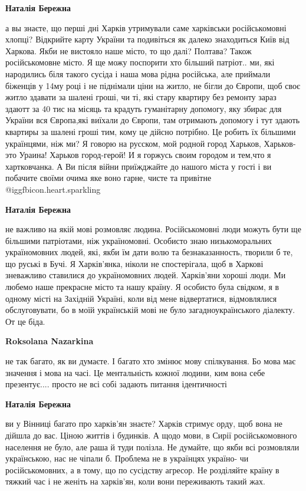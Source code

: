 \begin{itemize}
\begin{itemize}
\textbf{Наталія Бережна} 

а вы знаєте, що перші дні Харків утримували саме харківськи російськомовні
хлопці? Відкрийте карту України та подивіться як далеко знаходиться Київ від
Харкова. Якби не вистояло наше місто, то що далі? Полтава? Також російськомовне
місто. Я ще можу поспорити хто більший патріот.. ми, які народились біля такого
сусіда і наша мова рідна російська, але приймали біженців у 14му році і не
піднімали ціни на житло, не бігли до Європи, щоб своє житло здавати за шалені
гроші, чи ті, які стару квартиру без ремонту зараз здаютт за 40 тис на місяць
та крадуть гуманітарну допомогу, яку збирає для України вся Європа,які виїхали
до Європи, там отримають допомогу і тут здають квартиры за шалені гроші тим,
кому це дійсно потрібно. Це робить їх більшими українцями, ніж ми? Я говорю на
русском, мой родной город Харьков, Харьков-это Ураина! Харьков город-герой! И я
горжусь своим городом и тем,что я хартковчанка. А Ви після війни приїжджайте до
нашого міста у гості і ви побачите своїми очима яке воно гарне, чисте та
привітне  @igg{fbicon.heart.sparkling} 

\textbf{Наталія Бережна} 

не важливо на якій мові розмовляє людина. Російськомовні люди можуть бути ще
більшими патріотами, ніж україномовні. Особисто знаю низькоморальних
україномовних людей, які, якби їм дати волю та безнаказанность, творили б те,
що руські в Бучі. Я Харків'янка, ніколи не спостерігала, щоб в Харкові
зневажливо ставилися до україномовних людей. Харків'яни хороші люди. Ми любемо
наше прекрасне місто та нашу країну. Я особисто була свідком, я в одному місті
на Західній Україні, коли від мене відвертатися, відмовлялися обслуговувати, бо
в моїй українській мові не було загадноукраїнського діалекту. От це біда.

\textbf{Roksolana Nazarkina} 

не так багато, як ви думаєте. І багато хто змінює мову спілкування. Бо мова має
значення і мова на часі. Це ментальність кожної людини, ким вона себе
презентує.... просто не всі собі задають питання ідентичності

\textbf{Наталія Бережна} 

ви у Вінниці багато про харків'ян знаєте? Харків стримує орду, щоб вона не
дійшла до вас. Ціною життів і будинків. А щодо мови, в Сирії російськомовного
населення не було, але раша й туди полізла. Не думайте, що якби всі розмовляли
українською, нас не чіпали б. Проблема не в українцях україно- чи
російськомовних, а в тому, що по сусідству агресор. Не розділяйте країну в
тяжкий час і не женіть на харків'ян, коли вони переживають такий жах.


\end{itemize}
\end{itemize}
